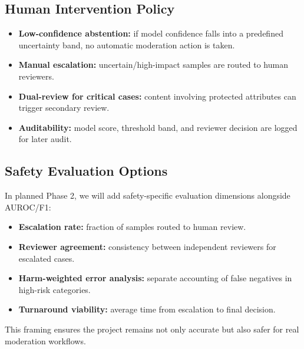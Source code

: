 \documentclass[11pt]{article}
\begin{document}
\subsection{Human Intervention Policy}
\begin{itemize}[leftmargin=*]
  \item \textbf{Low-confidence abstention:} if model confidence falls into a predefined uncertainty band, no automatic moderation action is taken.
  \item \textbf{Manual escalation:} uncertain/high-impact samples are routed to human reviewers.
  \item \textbf{Dual-review for critical cases:} content involving protected attributes can trigger secondary review.
  \item \textbf{Auditability:} model score, threshold band, and reviewer decision are logged for later audit.
\end{itemize}

\subsection{Safety Evaluation Options}
In planned Phase 2, we will add safety-specific evaluation dimensions alongside AUROC/F1:
\begin{itemize}[leftmargin=*]
  \item \textbf{Escalation rate:} fraction of samples routed to human review.
  \item \textbf{Reviewer agreement:} consistency between independent reviewers for escalated cases.
  \item \textbf{Harm-weighted error analysis:} separate accounting of false negatives in high-risk categories.
  \item \textbf{Turnaround viability:} average time from escalation to final decision.
\end{itemize}

This framing ensures the project remains not only accurate but also safer for real moderation workflows.
\end{document}
